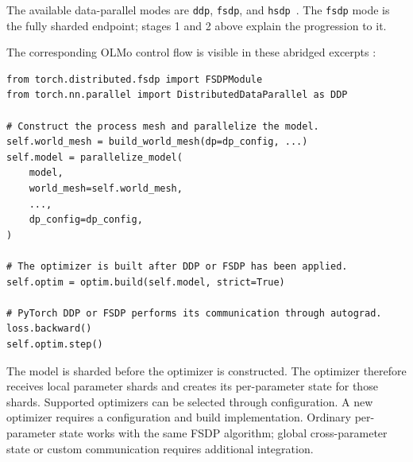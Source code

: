 \documentclass[11pt]{article}
\begin{document}
The available data-parallel modes are \texttt{ddp}, \texttt{fsdp}, and
\texttt{hsdp}~\cite{olmo-data-parallel}. The \texttt{fsdp} mode is the fully
sharded endpoint; stages 1 and 2 above explain the progression to it.

The corresponding OLMo control flow is visible in these abridged excerpts
\cite{olmo-transformer-train-module}:

\begin{lstlisting}[basicstyle=\ttfamily\footnotesize]
from torch.distributed.fsdp import FSDPModule
from torch.nn.parallel import DistributedDataParallel as DDP

# Construct the process mesh and parallelize the model.
self.world_mesh = build_world_mesh(dp=dp_config, ...)
self.model = parallelize_model(
    model,
    world_mesh=self.world_mesh,
    ...,
    dp_config=dp_config,
)

# The optimizer is built after DDP or FSDP has been applied.
self.optim = optim.build(self.model, strict=True)

# PyTorch DDP or FSDP performs its communication through autograd.
loss.backward()
self.optim.step()
\end{lstlisting}

The model is sharded before the optimizer is constructed. The optimizer
therefore receives local parameter shards and creates its per-parameter state
for those shards. Supported optimizers can be selected through configuration.
A new optimizer requires a configuration and build implementation. Ordinary
per-parameter state works with the same FSDP algorithm; global
cross-parameter state or custom communication requires additional integration.
\end{document}
